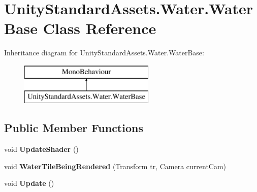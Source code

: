 \hypertarget{class_unity_standard_assets_1_1_water_1_1_water_base}{}\section{Unity\+Standard\+Assets.\+Water.\+Water\+Base Class Reference}
\label{class_unity_standard_assets_1_1_water_1_1_water_base}
Inheritance diagram for Unity\+Standard\+Assets.\+Water.\+Water\+Base\+:\begin{figure}[H]
\begin{center}
\leavevmode
\includegraphics[height=2.000000cm]{class_unity_standard_assets_1_1_water_1_1_water_base}
\end{center}
\end{figure}
\subsection*{Public Member Functions}
\begin{DoxyCompactItemize}
\item 
void {\bfseries Update\+Shader} ()\hypertarget{class_unity_standard_assets_1_1_water_1_1_water_base_a042c631313c1ec111b50ba4be3ee4c49}{}\label{class_unity_standard_assets_1_1_water_1_1_water_base_a042c631313c1ec111b50ba4be3ee4c49}

\item 
void {\bfseries Water\+Tile\+Being\+Rendered} (Transform tr, Camera current\+Cam)\hypertarget{class_unity_standard_assets_1_1_water_1_1_water_base_a9496cf672bf0909b0496521aaa1c9029}{}\label{class_unity_standard_assets_1_1_water_1_1_water_base_a9496cf672bf0909b0496521aaa1c9029}

\item 
void {\bfseries Update} ()\hypertarget{class_unity_standard_assets_1_1_water_1_1_water_base_a08a8f68c9598589516d153ab6c9fd5eb}{}\label{class_unity_standard_assets_1_1_water_1_1_water_base_a08a8f68c9598589516d153ab6c9fd5eb}

\end{DoxyCompactItemize}
